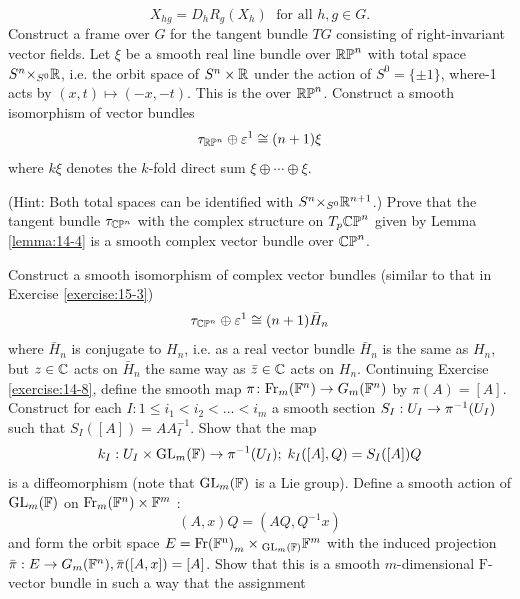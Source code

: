 \begin{enumerate}[label=\theexercise.\arabic*.,ref=\theexercise.\arabic*,leftmargin=2.7em]
    \[
      {X}_{hg} = {D}_{h}{R}_{g}( {X}_{h}) \;\text{ for all }h,g \in  G.
    \]
    Construct a frame over $G$ for the tangent bundle ${TG}$ consisting of right-invariant vector fields.
  \NewItem Let $\xi$ be a smooth real line bundle over ${\mathbb{{RP}}}^{n}$ with total space ${S}^{n}{ \times  }_{{S}^{0}}\mathbb{R}$, i.e. the orbit space of ${S}^{n} \times  \mathbb{R}$ under the action of ${S}^{0} = \{  \pm  1\}$, where-1 acts by $( {x,t})  \mapsto  ( {-x,- t})$. This is the  over ${\mathbb{{RP}}}^{n}$. Construct a smooth isomorphism of vector bundles
    \[
      {\tau }_{\mathbb{RP}^n} \oplus  {\varepsilon }^{1} \cong  ( {n + 1}) \xi
    \]
    where ${k\xi }$ denotes the $k$-fold direct sum $\xi  \oplus  \cdots  \oplus  \xi$. \par(Hint: Both total spaces can be identified with ${S}^{n}{ \times  }_{{S}^{0}}{\mathbb{R}}^{n + 1}$.)
  \NewItem Prove that the tangent bundle ${\tau }_{{\mathbb{{CP}}}^{n}}$ with the complex structure on ${T}_{p}{\mathbb{{CP}}}^{n}$ given by Lemma \ref{lemma:14-4} is a smooth complex vector bundle over ${\mathbb{{CP}}}^{n}$.
  \par Construct a smooth isomorphism of complex vector bundles (similar to that in Exercise \ref{exercise:15-3})
    \[
      {\tau }_{{\mathbb{{CP}}}^{n}} \oplus  {\varepsilon }^{1} \cong  ( {n + 1}) {\bar{H}}_{n}
    \]
    where ${\bar{H}}_{n}$ is conjugate to ${H}_{n}$, i.e. as a real vector bundle ${\bar{H}}_{n}$ is the same as ${H}_{n}$, but $z \in  \mathbb{C}$ acts on ${\bar{H}}_{n}$ the same way as $\bar{z} \in  \mathbb{C}$ acts on ${H}_{n}$.
  \NewItem Continuing Exercise \ref{exercise:14-8}, define the smooth map $\pi\colon  {\ensuremath{\mathrm{Fr}}}_{m}( {\mathbb{F}}^{n})  \rightarrow  {G}_{m}( {\mathbb{F}}^{n})$ by $\pi ( A)  = [  A]$.
    Construct for each $I : 1 \leq  {i}_{1} < {i}_{2} < \ldots  < {i}_{m}$ a smooth section ${S}_{I} : {U}_{I} \rightarrow  {\pi }^{-1}( {U}_{I})$ such that ${S}_{I}( [  A]  )  = A{A}_{I}^{-1}$. Show that the map
    \[
      {k}_{I} : {U}_{I} \times  {\mathrm{{GL}}}_{m}( \mathbb{F})  \rightarrow  {\pi }^{-1}( {U}_{I});\;{k}_{I}( {[  A] ,Q})  = {S}_{I}( [  A]  ) Q
    \]
    is a diffeomorphism (note that ${\mathrm{{GL}}}_{m}( \mathbb{F})$ is a Lie group). Define a smooth action of ${\mathrm{{GL}}}_{m}( \mathbb{F})$ on ${\mathrm{Fr}}_{m}( {\mathbb{F}}^{n})  \times  {\ensuremath{\mathbb{F}}}^{m}$ :
    \[
      ( {A,x}) Q = ( {{AQ},{Q}^{-1}x})
    \]
    and form the orbit space $E = \mathrm{Fr}{( {\mathbb{F}}^{\mathrm{n}}) }_{m} \times  {}_{{\mathrm{{GL}}}_{m}( \mathbb{F}) }{\mathbb{F}}^{m}$ with the induced projection $\bar{\pi } : E \rightarrow  {G}_{m}( {\mathbb{F}}^{n}),\bar{\pi }( [  {A,x}]  )  = [  A]$. Show that this is a smooth $m$-dimensional $\mathrm{F}$-vector bundle in such a way that the assignment

\end{enumerate}
